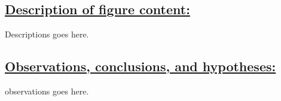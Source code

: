 \documentclass{article}\usepackage[]{graphicx}\usepackage[]{color}
\begin{document}
\subsection*{\underline{Description of figure content:}}
\par{
Descriptions goes here.
}
\subsection*{\underline{Observations, conclusions, and hypotheses:}}
\par{
observations goes here.
}
\end{document}
